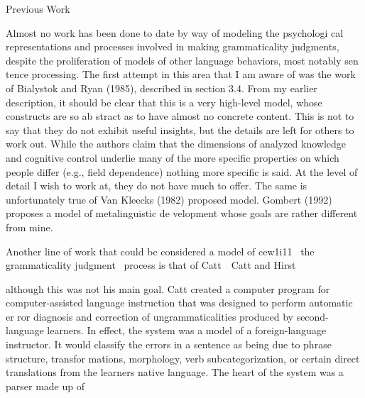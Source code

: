 \begin{styleHeadingviii}
Previous Work
\end{styleHeadingviii}


\begin{styleStandard}
Almost no work has been done to date by way of modeling the psychologi\- cal representations and processes involved in making grammaticality judgments, despite the proliferation of models of other language behaviors, most notably sen\- tence processing. The first attempt in this area that I am aware of was the work of Bialystok and Ryan (1985), described in section 3.4. From my earlier description, it should be clear that this is a very high-level model, whose constructs are so ab\- stract as to have almost no concrete content. This is not to say that they do not exhibit useful insights, but the details are left for others to work out. While the authors claim that the dimensions of analyzed knowledge and cognitive control underlie many of the more specific properties on which people differ (e.g., field dependence) nothing more specific is said. At the level of detail I wish to work at, they do not have much to offer. The same is unfortunately true of Van Kleeck{\textquotesingle}s (1982) proposed model. Gombert (1992) proposes a model of metalinguistic de\- velopment whose goals are rather different from mine.
\end{styleStandard}


\begin{styleStandard}
Another line of work that could be considered a model of cew1i11 \ the grammaticality judgment \ process is that of Catt\ \ Catt and Hirst
\end{styleStandard}


\begin{styleStandard}
although this was not his main goal. Catt created a computer program for computer-assisted language instruction that was designed to perform automatic er\- ror diagnosis and correction of ungrammaticalities produced by second-language learners. In effect, the system was a model of a foreign-language instructor. It would classify the errors in a sentence as being due to phrase structure, transfor\- mations, morphology, verb subcategorization, or certain direct translations from the learner{\textquotesingle}s native language. The heart of the system was a parser made up of
\end{styleStandard}


